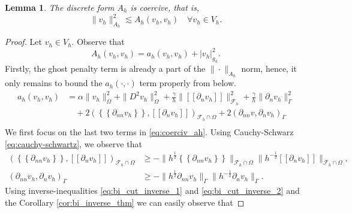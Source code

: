 \documentclass[11pt]{article}
\newtheorem{lemma}[theorem]{Lemma}
\theoremstyle{remark}
\newcommand{\mean}[1]{\left\{\!\!\left\{#1\right\}\!\!\right\}}
\newcommand{\jump}[1]{\left[\!\left[ #1 \right]\!\right]}
\newcommand{\abs}[1]{\left\lvert #1 \right\rvert}
\renewcommand{\ge}{\geqslant}
\numberwithin{equation}{section}
\begin{document}
\begin{lemma}
    \label{lemma:bi_Ah_coercive}
    The discrete form $A_{h}$ is coercive, that is, \[
    \| v_{h} \|_{ A_{h} }^{ 2 }  \lesssim A_{h}( v_{h},v_{h})\quad  \forall v_{h} \in V_{h}.
    \]
\end{lemma}

\begin{proof}
    Let $v_{h} \in V_{h}$.
    Observe that
    \begin{equation}
    A_{h}( v_{h},v_{h}) = a_{h}( v_{h},v_{h})  + \abs{ v_{h} }_{g_{h}}^{2}.
    \end{equation}
    Firstly, the ghost penalty term is already a part of the $\| \cdot  \|_{ A_{h} }^{  } $ norm, hence, it only remains to bound the $a_{h}( \cdot ,\cdot ) $ term properly from below.
    \begin{equation}
        \label{eq:coerciv_ah}
    \begin{split}
       a_{h}( v_{h},v_{h}) &=   \alpha \| v_{h} \|_{   \Omega   }^{2} + \| D^2v_{h} \|_{   \Omega  }^{2  }  + \frac{\gamma }{h}  \|  \jump{ \partial _{n} v_{h} }\|_{\mathcal{F} _{h}^{}  }^{ 2 } + \frac{\gamma }{h}  \| \partial _{n} v_{h} \|_{ \Gamma  }^{ 2 } \\
                   & \quad + 2 ( \mean{ \partial _{nn} v_{h} }, \jump{ \partial _{n} v_{h} }    )_{\mathcal{F} ^{}_{h} \cap \Omega }  + 2 (  \partial _{nn} v ,
       \partial _{n} v_{h}  )_{\Gamma } \\
    \end{split}
    \end{equation}
    We first focus on the last two terms in \eqref{eq:coerciv_ah}. Using Cauchy-Schwarz \eqref{eq:cauchy-schwartz}, we observe that
    \begin{equation}
        \begin{split}
    ( \mean{ \partial _{nn} v_{h} }  , \jump{ \partial _{n} v_{h} }  )_{\mathcal{F}^{}_{h}\cap \Omega  } & \geqslant - \| h^{\frac{1}{2}}\mean{ \partial _{nn} v_{h} }   \|_{ \mathcal{F}^{}_{h}\cap \Omega   }^{  }  \|h^{-\frac{1}{2}} \jump{ \partial _{n} v_{h} }   \|_{
    \mathcal{F}^{}_{h}\cap \Omega   }^{  }, \\
    (  \partial _{nn} v_{h}   ,  \partial _{n} v_{h}   )_{\Gamma   } & \ge - \| h^{\frac{1}{2}} \partial _{nn} v_{h}    \|_{ \Gamma    }^{  }  \|h^{-\frac{1}{2}}  \partial _{n} v_{h}    \|_{ \Gamma    }^{  }.
        \end{split}
    \end{equation}
    Using inverse-inequalities \eqref{eq:bi_cut_inverse_1} and \eqref{eq:bi_cut_inverse_2} and the Corollary \ref{cor:bi_inverse_thm} we can easily observe that

\end{proof}
\end{document}
